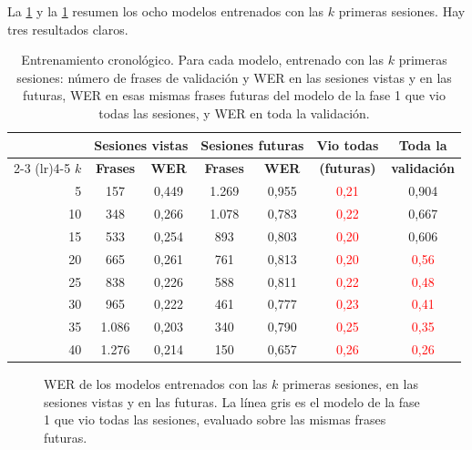 La \cref{tab:res-cronologico} y la \cref{fig:res-cronologico} resumen los ocho modelos entrenados con las $k$ primeras sesiones. Hay tres resultados claros.

\begin{table}[htbp]
  \centering
  \caption{Entrenamiento cronológico. Para cada modelo, entrenado con las $k$ primeras sesiones: número de frases de validación y WER en las sesiones vistas y en las futuras, WER en esas mismas frases futuras del modelo de la fase 1 que vio todas las sesiones, y WER en toda la validación.}
  \label{tab:res-cronologico}
  \small
  \begin{tabular}{rcccccc}
    \toprule
    & \multicolumn{2}{c}{\textbf{Sesiones vistas}} & \multicolumn{2}{c}{\textbf{Sesiones futuras}} & \textbf{Vio todas} & \textbf{Toda la} \\
    \cmidrule(lr){2-3} \cmidrule(lr){4-5}
    $k$ & \textbf{Frases} & \textbf{WER} & \textbf{Frases} & \textbf{WER} & \textbf{(futuras)} & \textbf{validación} \\
    \midrule
    5  & 157   & 0,449 & 1.269 & 0,955 & \textcolor{red}{0,21} & 0,904 \\
    10 & 348   & 0,266 & 1.078 & 0,783 & \textcolor{red}{0,22} & 0,667 \\
    15 & 533   & 0,254 & 893   & 0,803 & \textcolor{red}{0,20} & 0,606 \\
    20 & 665   & 0,261 & 761   & 0,813 & \textcolor{red}{0,20} & \textcolor{red}{0,56} \\
    25 & 838   & 0,226 & 588   & 0,811 & \textcolor{red}{0,22} & \textcolor{red}{0,48} \\
    30 & 965   & 0,222 & 461   & 0,777 & \textcolor{red}{0,23} & \textcolor{red}{0,41} \\
    35 & 1.086 & 0,203 & 340   & 0,790 & \textcolor{red}{0,25} & \textcolor{red}{0,35} \\
    40 & 1.276 & 0,214 & 150   & 0,657 & \textcolor{red}{0,26} & \textcolor{red}{0,26} \\
    \bottomrule
  \end{tabular}
\end{table}

\begin{figure}[htbp]
  \centering
  \caption{WER de los modelos entrenados con las $k$ primeras sesiones, en las sesiones vistas y en las futuras. La línea gris es el modelo de la fase 1 que vio todas las sesiones, evaluado sobre las mismas frases futuras.}
  \label{fig:res-cronologico}
\end{figure}

